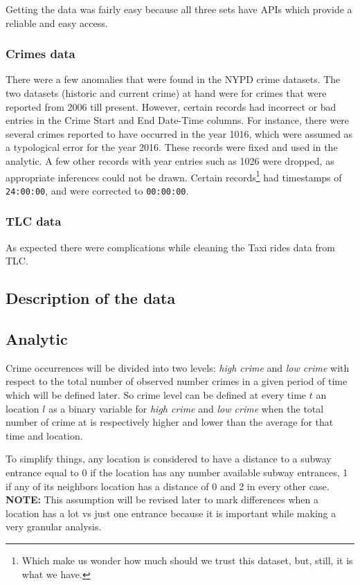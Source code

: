 \documentclass{sigkddExp}
\begin{document}
Getting the data was fairly easy because all three sets have APIs which provide a reliable and easy access.

\subsubsection{Crimes data}
There were a few anomalies that were found in the NYPD crime datasets. The two datasets (historic and current crime) at hand were for crimes that were reported from 2006 till present. However, certain records had incorrect or bad entries in the Crime Start and End Date-Time columns. For instance, there were several crimes reported to have occurred in the year 1016, which were assumed as a typological error for the year 2016. These records were fixed and used in the analytic. A few other records with year entries such as 1026 were dropped, as appropriate inferences could not be drawn. Certain records\footnote{Which make us wonder how much should we trust this dataset, but, still, it is what we have.} had timestamps of \texttt{24:00:00}, and were corrected to \texttt{00:00:00}.

\subsubsection{TLC data}
As expected there were complications while cleaning the Taxi rides data from TLC.

\subsection{Description of the data}


\subsection{Analytic}

Crime occurrences will be divided into  two levels: \textit{high crime} and  \textit{low crime} with respect to the total number of observed number crimes in a given period of time which will be defined later.
So crime level can be defined at every time $t$ an location $l$ as a binary variable for \textit{high crime} and \textit{low crime} when the total number of crime at is respectively higher and lower  than the average for that time and location.

To simplify things, any location is considered to have a  distance to a subway entrance equal to 0 if the location has any number available subway entrances,  1 if any of its neighbors location has a distance of 0 and 2 in every other case. \textbf{NOTE:} This assumption will be revised later to mark differences when a location has a lot vs just one entrance because it is important while making a very granular analysis.
\end{document}
